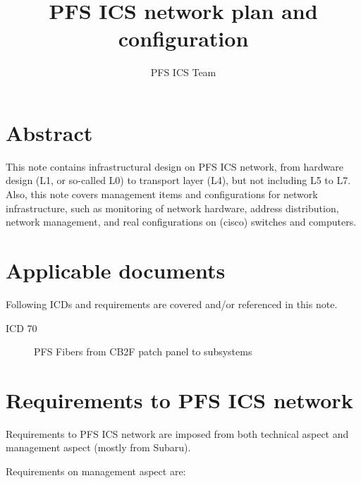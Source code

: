 \documentclass[a4paper,notitlepage]{article}
\title{PFS ICS network plan and configuration}
\author{PFS ICS Team}
\begin{document}

\ssnhead

\section{Abstract}

This note contains infrastructural design on PFS ICS network, from hardware 
design (L1, or so-called L0) to transport layer (L4), but not including L5 
to L7. 
Also, this note covers management items and configurations for network 
infrastructure, such as monitoring of network hardware, address distribution, 
network management, and real configurations on (cisco) switches and computers. 

\section{Applicable documents}

Following ICDs and requirements are covered and/or referenced in this note. 

\begin{description}
  \item[ICD 70] PFS Fibers from CB2F patch panel to subsystems
\end{description}


\section{Requirements to PFS ICS network}

Requirements to PFS ICS network are imposed from both technical aspect and 
management aspect (mostly from Subaru). 

Requirements on management aspect are:
\end{document}
